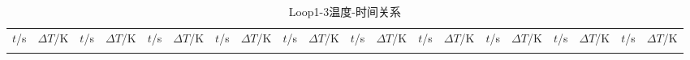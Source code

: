 \documentclass[cn,hazy,pku,12pt,normal,math=newtx,cite=super]{elegantnote}
\begin{document}
{\begin{longtable}{cc|cc|cc|cc|cc|cc|cc|cc|cc|cc}
\end{longtable}

\begin{longtable}{cc|cc|cc|cc|cc|cc|cc|cc|cc|cc}
\toprule
\endhead

\caption{Loop1-3温度-时间关系}\\
\toprule
$t$/\si{s} & $\Delta T$/\si{K} & $t$/\si{s} & $\Delta T$/\si{K} & $t$/\si{s} & $\Delta T$/\si{K} & $t$/\si{s} & $\Delta T$/\si{K} & $t$/\si{s} & $\Delta T$/\si{K} & $t$/\si{s} & $\Delta T$/\si{K} & $t$/\si{s} & $\Delta T$/\si{K} & $t$/\si{s} & $\Delta T$/\si{K} & $t$/\si{s} & $\Delta T$/\si{K} & $t$/\si{s} & $\Delta T$/\si{K} \\
\midrule
\endfirsthead

\bottomrule
\endfoot

\bottomrule
\endlastfoot


\end{longtable}}
\end{document}
